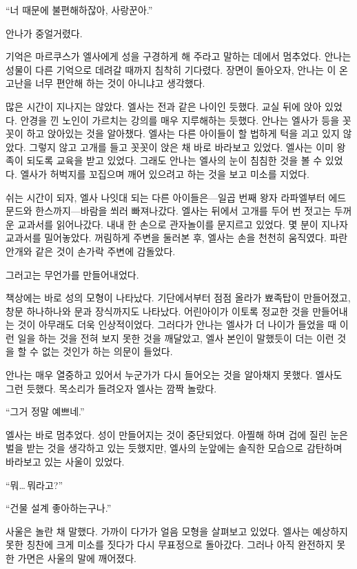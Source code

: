 ``너 때문에 불편해하잖아, 사랑꾼아.''

안나가 중얼거렸다.

기억은 마르쿠스가 엘사에게 성을 구경하게 해 주라고 말하는 데에서 멈추었다. 안나는 성물이 다른 기억으로 데려갈 때까지 침착히 기다렸다. 장면이 돌아오자, 안나는 이 온 고난을 너무 편안해 하는 것이 아니냐고 생각했다.

많은 시간이 지나지는 않았다. 엘사는 전과 같은 나이인 듯했다. 교실 뒤에 앉아 있었다. 안경을 낀 노인이 가르치는 강의를 매우 지루해하는 듯했다. 안나는 엘사가 등을 꼿꼿이 하고 앉아있는 것을 알아챘다. 엘사는 다른 아이들이 할 법하게 턱을 괴고 있지 않았다. 그렇지 않고 고개를 들고 꼿꼿이 앉은 채 바로 바라보고 있었다. 엘사는 이미 왕족이 되도록 교육을 받고 있었다. 그래도 안나는 엘사의 눈이 침침한 것을 볼 수 있었다. 엘사가 허벅지를 꼬집으며 깨어 있으려고 하는 것을 보고 미소를 지었다.

쉬는 시간이 되자, 엘사 나잇대 되는 다른 아이들은—일곱 번째 왕자 라파엘부터 에드문드와 한스까지—바람을 쐬러 빠져나갔다. 엘사는 뒤에서 고개를 두어 번 젓고는 두꺼운 교과서를 읽어나갔다. 내내 한 손으로 관자놀이를 문지르고 있었다. 몇 분이 지나자 교과서를 밀어놓았다. 꺼림하게 주변을 둘러본 후, 엘사는 손을 천천히 움직였다. 파란 안개와 같은 것이 손가락 주변에 감돌았다.

그러고는 무언가를 만들어내었다.

책상에는 바로 성의 모형이 나타났다. 기단에서부터 점점 올라가 뾰족탑이 만들어졌고, 창문 하나하나와 문과 장식까지도 나타났다. 어린아이가 이토록 정교한 것을 만들어내는 것이 아무래도 더욱 인상적이었다. 그러다가 안나는 엘사가 더 나이가 들었을 때 이런 일을 하는 것을 전혀 보지 못한 것을 깨달았고, 엘사 본인이 말했듯이 더는 이런 것을 할 수 없는 것인가 하는 의문이 들었다.

안나는 매우 열중하고 있어서 누군가가 다시 들어오는 것을 알아채지 못했다. 엘사도 그런 듯했다. 목소리가 들려오자 엘사는 깜짝 놀랐다.

``그거 정말 예쁘네.''

엘사는 바로 멈추었다. 성이 만들어지는 것이 중단되었다. 아찔해 하며 겁에 질린 눈은 벌을 받는 것을 생각하고 있는 듯했지만, 엘사의 눈앞에는 솔직한 모습으로 감탄하며 바라보고 있는 사울이 있었다.

``뭐\ldots\,뭐라고?''

``건물 설계 좋아하는구나.''

사울은 놀란 채 말했다. 가까이 다가가 얼음 모형을 살펴보고 있었다. 엘사는 예상하지 못한 칭찬에 크게 미소를 짓다가 다시 무표정으로 돌아갔다. 그러나 아직 완전하지 못한 가면은 사울의 말에 깨어졌다.

